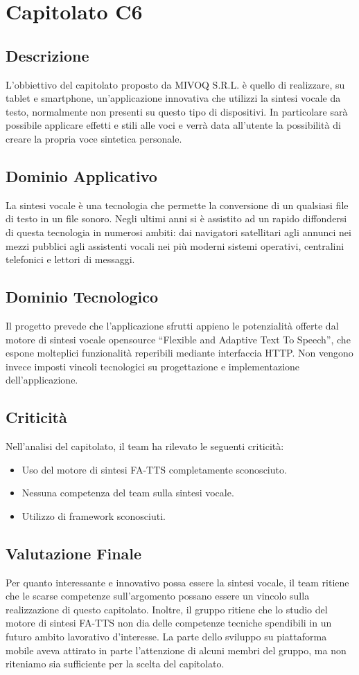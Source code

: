 \newpage
\section{Capitolato C6}
\subsection{Descrizione}
L’obbiettivo del capitolato proposto da MIVOQ S.R.L. è quello di realizzare, su tablet e smartphone, un’applicazione innovativa che utilizzi la sintesi vocale da testo, normalmente non presenti su questo tipo di dispositivi. In particolare sarà possibile applicare effetti e stili alle voci e verrà data all’utente la possibilità di creare la propria voce sintetica personale.

\subsection{Dominio Applicativo}
La sintesi vocale è una tecnologia che permette la conversione di un qualsiasi file di testo in un file sonoro. Negli ultimi anni si è assistito ad un rapido diffondersi di questa tecnologia in numerosi ambiti: dai navigatori satellitari agli annunci nei mezzi pubblici agli assistenti vocali nei più moderni sistemi operativi, centralini telefonici e lettori di messaggi.

\subsection{Dominio Tecnologico}
Il progetto prevede che l’applicazione sfrutti appieno le potenzialità offerte dal motore di sintesi vocale opensource “Flexible and Adaptive Text To Speech”, che espone molteplici funzionalità reperibili mediante interfaccia HTTP. Non vengono invece imposti vincoli tecnologici su progettazione e implementazione dell’applicazione.

\subsection{Criticità}
Nell'analisi del capitolato, il team ha rilevato le seguenti criticità:
\begin{itemize}
\item Uso del motore di sintesi FA-TTS completamente sconosciuto.
\item Nessuna competenza del team sulla sintesi vocale.
\item Utilizzo di framework sconosciuti.
\end{itemize}

\subsection{Valutazione Finale}
Per quanto interessante e innovativo possa essere la sintesi vocale, il team ritiene che le scarse competenze sull’argomento possano essere un vincolo sulla realizzazione di questo capitolato. Inoltre, il gruppo ritiene che lo studio del motore di sintesi FA-TTS non dia delle competenze tecniche spendibili in un futuro ambito lavorativo d’interesse.
La parte dello sviluppo su piattaforma mobile aveva attirato in parte l’attenzione di alcuni membri del gruppo, ma non riteniamo sia sufficiente per la scelta del capitolato.
